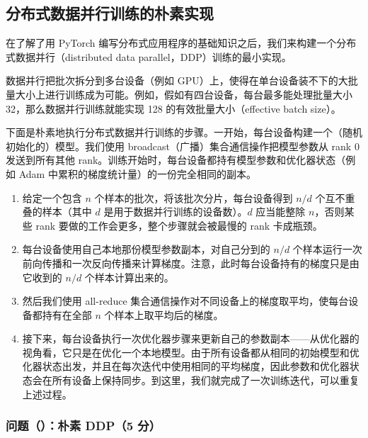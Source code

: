 
\subsection{分布式数据并行训练的朴素实现}

在了解了用 PyTorch 编写分布式应用程序的基础知识之后，我们来构建一个分布式数据并行（distributed data parallel，DDP）训练的最小实现。

数据并行把批次拆分到多台设备（例如 GPU）上，使得在单台设备装不下的大批量大小上进行训练成为可能。例如，假如有四台设备，每台最多能处理批量大小 32，那么数据并行训练就能实现 128 的有效批量大小（effective batch size）。

下面是朴素地执行分布式数据并行训练的步骤。一开始，每台设备构建一个（随机初始化的）模型。我们使用 broadcast（广播）集合通信操作把模型参数从 rank 0 发送到所有其他 rank。训练开始时，每台设备都持有模型参数和优化器状态（例如 Adam 中累积的梯度统计量）的一份完全相同的副本。

\begin{enumerate}
  \item 给定一个包含 $n$ 个样本的批次，将该批次分片，每台设备得到 $n/d$ 个互不重叠的样本（其中 $d$ 是用于数据并行训练的设备数）。$d$ 应当能整除 $n$，否则某些 rank 要做的工作会更多，整个步骤就会被最慢的 rank 卡成瓶颈。
  \item 每台设备使用自己本地那份模型参数副本，对自己分到的 $n/d$ 个样本运行一次前向传播和一次反向传播来计算梯度。注意，此时每台设备持有的梯度只是由它收到的 $n/d$ 个样本计算出来的。
  \item 然后我们使用 all-reduce 集合通信操作对不同设备上的梯度取平均，使每台设备都持有在全部 $n$ 个样本上取平均后的梯度。
  \item 接下来，每台设备执行一次优化器步骤来更新自己的参数副本——从优化器的视角看，它只是在优化一个本地模型。由于所有设备都从相同的初始模型和优化器状态出发，并且在每次迭代中使用相同的平均梯度，因此参数和优化器状态会在所有设备上保持同步。到这里，我们就完成了一次训练迭代，可以重复上述过程。
\end{enumerate}

\subsubsection*{问题（）：朴素 DDP（5 分）}

